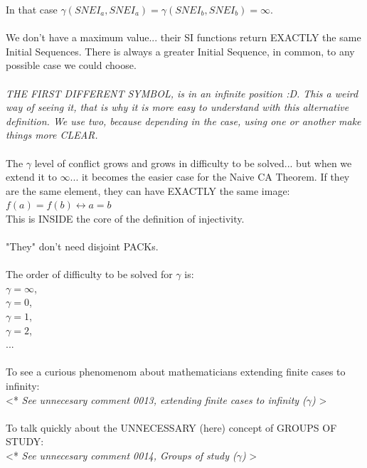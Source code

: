 		\noindent
		In that case $\gamma(SNEI_{a},SNEI_{a})=\gamma(SNEI_{b}, SNEI_{b})=\infty$.
		\\\\
		
		\noindent
		We don't have a maximum value... their SI functions return EXACTLY the same Initial Sequences. There is always a greater Initial Sequence, in common, to any possible case we could choose.
		\\\\
		
		\noindent
		\textit{THE FIRST DIFFERENT SYMBOL, is in an infinite position :D. This a weird way of seeing it, that is why it is more easy to understand with this alternative definition. We use two, because depending in the case, using one or another make things more CLEAR.}
		\\\\
		
		\noindent
		The $\gamma$ level of conflict grows and grows in difficulty to be solved... but when we extend it to $\infty$... it becomes the easier case for the Naive CA Theorem. If they are the same element, they can have EXACTLY the same image:\\
		$f(a)=f(b) \leftrightarrow a = b $\\
		This is INSIDE the core of the definition of injectivity.
		\\\\
		
		\noindent
		"They" don't need disjoint PACKs.
		\\\\
		
		\noindent
		The order of difficulty to be solved for $\gamma$ is:\\
		$ \gamma =\infty$,\\ 
		$ \gamma=0$,\\
		$ \gamma=1$,\\ 
		$ \gamma=2$,\\
		$ ... $
		\\\\
		 
		\noindent
		To see a curious phenomenom about mathematicians extending finite cases to infinity:\\
		\textless ** \textit{See unnecesary comment 0013, extending finite cases to infinity ($\gamma$)} \textgreater
		\\\\
		
		\noindent
		To talk quickly about the UNNECESSARY (here) concept of GROUPS OF STUDY:\\
		\textless ** \textit{See unnecesary comment 0014, Groups of study ($\gamma$)} \textgreater
		\\\\
	
	 
	
	
	